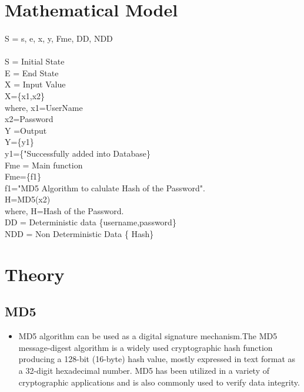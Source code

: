 \documentclass[a4paper,12pt]{article}
\begin{document}
\section{Mathematical Model}
	\paragraph{} 
		S 	= {s, e, x, y, Fme, DD, NDD}  											\\\\
	S   =   Initial State  										\\
	E 	=   End State  																\\
	X	= Input Value\\
	    X=\{x1,x2\} \\
	  where,  x1=UserName\\
	    x2=Password\\
	Y	=Output\\
	Y=\{y1\}\\
	y1=\{"Successfully added into Database\}\\
	 Fme 	= 	Main function \\
	 Fme=\{f1\}\\f1="MD5 Algorithm to calulate Hash of the Password".\\
	 H=MD5(x2)\\
	 where, H=Hash of the Password.\\
	DD 	= 	Deterministic data \{username,password\}\\
	NDD	= 	Non Deterministic Data \{ Hash\}															\\
  
	
\section{Theory}
	
	\subsection{MD5}
	\begin{itemize}
	    \item 
MD5 algorithm can be used as a digital
signature mechanism.The MD5 message-digest algorithm is a widely used cryptographic hash function producing a 128-bit (16-byte) hash value, mostly expressed in text format as a 32-digit hexadecimal number. MD5 has been utilized in a variety of cryptographic applications and is also commonly used to verify data integrity.
	\end{itemize}
\end{document}
